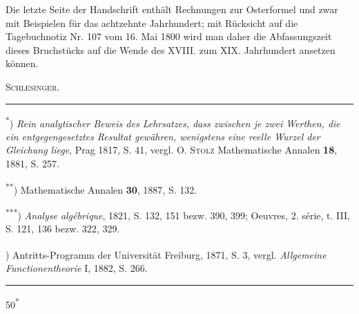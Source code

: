 Die letzte Seite der Handschrift enthält Rechnungen zur Osterformel und zwar mit Beispielen für das achtzehnte Jahrhundert; mit Rücksicht auf die Tagebuchnotiz Nr. 107 vom 16. Mai 1800 wird man daher die Abfassungszeit dieses Bruchstücks auf die Wende des XVIII. zum XIX. Jahrhundert ansetzen können.
\begin{flushright}\textsc{Schlesinger}.\end{flushright}
\par\medskip\noindent\rule{.24\linewidth}{.4pt}\par\smallskip
{\small
\noindent\hspace*{\parindent}\textsuperscript{*}) \textit{Rein analytischer Beweis des Lehrsatzes, dass zwischen je zwei Werthen, die ein entgegengesetztes Resultat gewähren, wenigstens eine reelle Wurzel der Gleichung liege}, Prag 1817, S. 41, vergl. O. \textsc{Stolz} Mathematische Annalen \textbf{18}, 1881, S. 257.
\par\noindent\hspace*{\parindent}\textsuperscript{**}) Mathematische Annalen \textbf{30}, 1887, S. 132.
\par\noindent\hspace*{\parindent}\textsuperscript{***}) \textit{Analyse algébrique}, 1821, S. 132, 151 bezw. 390, 399; Oeuvres, 2. série, t. III, S. 121, 136 bezw. 322, 329.
\par\noindent\hspace*{\parindent}\textsuperscript{\dag}) Antritts-Programm der Universität Freiburg, 1871, S. 3, vergl. \textit{Allgemeine Functionentheorie} I, 1882, S. 266.
\par}
\begin{center}\rule{.24\linewidth}{.4pt}\end{center}
\noindent\hfill50\textsuperscript{*}
